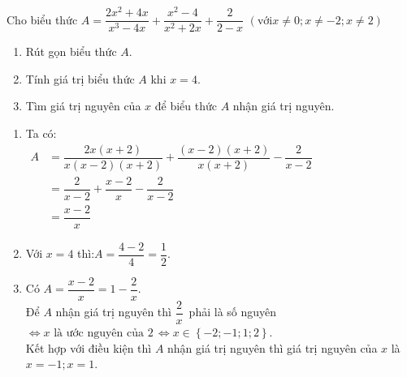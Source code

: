 \begin{ex}%
	Cho biểu thức $A=\dfrac{2x^2+4x}{x^3-4x}+\dfrac{x^2-4}{x^2+2x}+\dfrac{2}{2-x} $ $(\text{với} x\ne0;x\ne-2;x\ne2)$
	\begin{enumerate}
	\item Rút gọn biểu thức $A$.
	\item Tính giá trị biểu thức $A$ khi $x=4$.
	\item Tìm giá trị nguyên của $x$ để biểu thức $A$ nhận giá trị nguyên.
	\end{enumerate}
\loigiai
{
\begin{enumerate}
\item Ta có: \\
$
\begin{aligned} 
 	A &=\dfrac{2x(x+2)}{x(x-2)(x+2)}+\dfrac{(x-2)(x+2)}{x(x+2)}-\dfrac{2}{x-2}\\
	&=\dfrac{2}{x-2}+\dfrac{x-2}{x}-\dfrac{2}{x-2}\\
	&=\dfrac{x-2}{x} 
\end{aligned}$

\item Với $x=4$ thì:$A=\dfrac{4-2}{4}=\dfrac{1}{2}$.
\item Có $A=\dfrac{x-2}{x}=1-\dfrac{2}{x}$.\\
Để $A$ nhận giá trị nguyên thì $\dfrac{2}{x}\,$ phải là số nguyên\\
$\Leftrightarrow x\text{ là ước nguyên của }2\,$$\Leftrightarrow x\in\left\{-2;-1;1;2\right\}$.\\
Kết hợp với điều kiện thì $A$ nhận giá trị nguyên thì giá trị nguyên của $x$ là $x=-1;x=1$.
\end{enumerate}
}
\end{ex}
